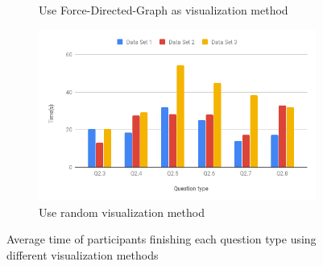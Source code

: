 \begin{figure}[h]
\begin{subfigure}[b]{0.48\textwidth}
		\caption{Use Force-Directed-Graph as visualization method}
	\end{subfigure}
	\begin{subfigure}[b]{0.48\textwidth}
	\centering
	\includegraphics[width=\textwidth]{pictures/TimeD}
	\caption{Use random visualization method}
\end{subfigure}
	\caption{Average time of participants finishing each question type using different visualization methods}
	\label{fig:averageV}
\end{figure}

